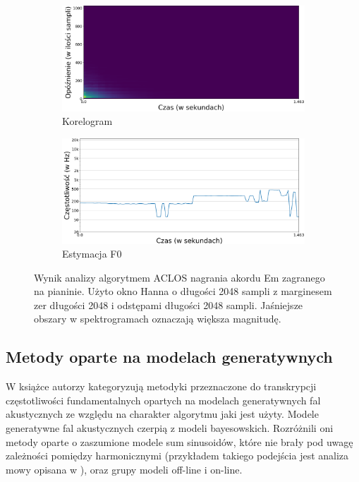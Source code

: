 \documentclass[12pt,a4paper,twoside]{mwart}
\begin{document}
\begin{figure}[H]
  \begin{subfigure}{0.5\textwidth}
    \includegraphics[width=1.\linewidth]{images/Em/Aclos_corelogram_cropped.png}
    \caption{Korelogram}
  \end{subfigure}
  \begin{subfigure}{0.49\textwidth}
    \includegraphics[width=1.\linewidth]{images/Em/Aclos_estymacja_cropped.png}
    \caption{Estymacja F0}
    \label{fig:multi:aclos:estimation}
  \end{subfigure}
  \caption{Wynik analizy algorytmem ACLOS nagrania akordu Em zagranego na pianinie. Użyto okno Hanna o długości 2048 sampli z marginesem zer długości 2048 i odstępami długości 2048 sampli. Jaśniejsze obszary w spektrogramach oznaczają większa magnitudę.}
  \label{fig:multi:aclos}
\end{figure}

\subsection{Metody oparte na modelach generatywnych}
W książce 
\cite[203-227]{Transcription:Anssi:SignalProcessingMethods}
autorzy kategoryzują metodyki przeznaczone do transkrypcji częstotliwości fundamentalnych opartych na modelach generatywnych fal akustycznych ze względu na charakter algorytmu jaki jest użyty. Modele generatywne fal akustycznych czerpią z modeli bayesowskich. Rozróżnili oni metody oparte o zaszumione modele sum sinusoidów, które nie brały pod uwagę zależności pomiędzy harmonicznymi (przykładem takiego podejścia jest analiza mowy opisana w 
\cite[744-745]{Transcription:McAulay:SinusoidalRepresentationF0}
), oraz grupy modeli off-line i on-line.
\end{document}
